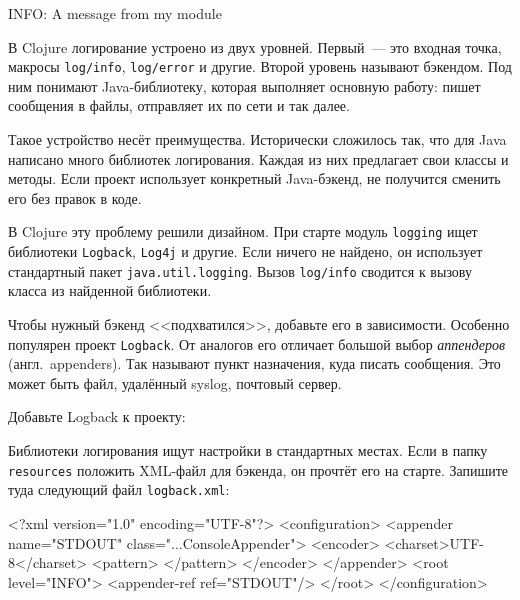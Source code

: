 \begin{english}
  \begin{text}
INFO: A message from my module
  \end{text}
\end{english}

В Clojure логирование устроено из двух уровней. Первый~--- это входная точка,
макросы \verb|log/info|, \verb|log/error| и другие. Второй уровень называют
бэкендом. Под ним понимают Java-библиотеку, которая выполняет основную работу:
пишет сообщения в файлы, отправляет их по сети и так далее.

Такое устройство несёт преимущества. Исторически сложилось так, что для Java
написано много библиотек логирования. Каждая из них предлагает свои классы и
методы. Если проект использует конкретный Java-бэкенд, не получится сменить его
без правок в коде.


В Clojure эту проблему решили дизайном. При старте модуль \verb|logging| ищет
библиотеки \verb|Logback|, \verb|Log4j| и другие. Если ничего не найдено, он
использует стандартный пакет \verb|java.util.logging|. Вызов \verb|log/info|
сводится к вызову класса из найденной библиотеки.

Чтобы нужный бэкенд <<подхватился>>, добавьте его в зависимости. Особенно
популярен проект \verb|Logback|. От аналогов его отличает большой выбор
\emph{аппендеров} (англ.~appenders). Так называют пункт назначения, куда писать
сообщения. Это может быть файл, удалённый syslog, почтовый сервер.

Добавьте Logback к проекту:

\begin{english}
  \begin{clojure}
  \end{clojure}
\end{english}


Библиотеки логирования ищут настройки в стандартных местах. Если в папку
\verb|resources| положить XML-файл для бэкенда, он прочтёт его на
старте. Запишите туда следующий файл \verb|logback.xml|:

\ifx\DEVICETYPE\MOBILE

\begin{english}
  \begin{xml}
<?xml version="1.0" encoding="UTF-8"?>
<configuration>
  <appender name="STDOUT"
    class="...ConsoleAppender">
    <encoder>
      <charset>UTF-8</charset>
      <pattern>
      </pattern>
    </encoder>
  </appender>
  <root level="INFO">
    <appender-ref ref="STDOUT"/>
  </root>
</configuration>
  \end{xml}
\end{english}

